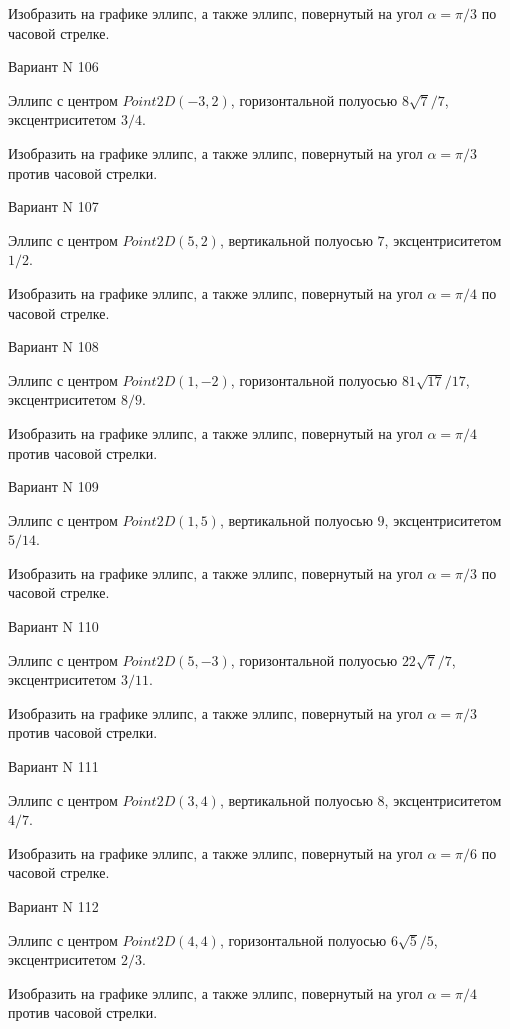 \documentclass[11pt]{report}
\begin{document}
    Изобразить на графике эллипс, а также эллипс, повернутый на угол $\alpha = $$\pi / 3$ по часовой стрелке.

Вариант N 106

Эллипс с центром $Point2D\left(-3, 2\right)$, горизонтальной полуосью $8 \sqrt{7} / 7$, эксцентриситетом $3 / 4$.

    Изобразить на графике эллипс, а также эллипс, повернутый на угол $\alpha = $$\pi / 3$ против часовой стрелки.

Вариант N 107

Эллипс с центром $Point2D\left(5, 2\right)$, вертикальной полуосью $7$, эксцентриситетом $1 / 2$.

    Изобразить на графике эллипс, а также эллипс, повернутый на угол $\alpha = $$\pi / 4$ по часовой стрелке.

Вариант N 108

Эллипс с центром $Point2D\left(1, -2\right)$, горизонтальной полуосью $81 \sqrt{17} / 17$, эксцентриситетом $8 / 9$.

    Изобразить на графике эллипс, а также эллипс, повернутый на угол $\alpha = $$\pi / 4$ против часовой стрелки.

Вариант N 109

Эллипс с центром $Point2D\left(1, 5\right)$, вертикальной полуосью $9$, эксцентриситетом $5 / 14$.

    Изобразить на графике эллипс, а также эллипс, повернутый на угол $\alpha = $$\pi / 3$ по часовой стрелке.

Вариант N 110

Эллипс с центром $Point2D\left(5, -3\right)$, горизонтальной полуосью $22 \sqrt{7} / 7$, эксцентриситетом $3 / 11$.

    Изобразить на графике эллипс, а также эллипс, повернутый на угол $\alpha = $$\pi / 3$ против часовой стрелки.

Вариант N 111

Эллипс с центром $Point2D\left(3, 4\right)$, вертикальной полуосью $8$, эксцентриситетом $4 / 7$.

    Изобразить на графике эллипс, а также эллипс, повернутый на угол $\alpha = $$\pi / 6$ по часовой стрелке.

Вариант N 112

Эллипс с центром $Point2D\left(4, 4\right)$, горизонтальной полуосью $6 \sqrt{5} / 5$, эксцентриситетом $2 / 3$.

    Изобразить на графике эллипс, а также эллипс, повернутый на угол $\alpha = $$\pi / 4$ против часовой стрелки.
\end{document}
